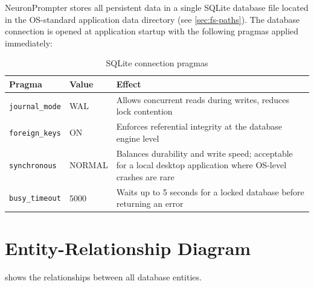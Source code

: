 \documentclass[a4paper, 11pt, oneside]{report}
\begin{document}
NeuronPrompter stores all persistent data in a single SQLite database file
located in the OS-standard application data directory (see
\cref{sec:fs-paths}).  The database connection is opened at application
startup with the following pragmas applied immediately:

\begin{table}[H]
  \centering
  \caption{SQLite connection pragmas}
  \label{tab:pragmas}
  \begin{tabularx}{\textwidth}{l l X}
    \toprule
    \textbf{Pragma} & \textbf{Value} & \textbf{Effect} \\
    \midrule
    \texttt{journal\_mode} & WAL    & Allows concurrent reads during writes,
                                       reduces lock contention~\cite{sqlite} \\
    \texttt{foreign\_keys}  & ON     & Enforces referential integrity at the
                                       database engine level \\
    \texttt{synchronous}    & NORMAL & Balances durability and write speed;
                                       acceptable for a local desktop application
                                       where OS-level crashes are rare \\
    \texttt{busy\_timeout}  & 5000   & Waits up to 5 seconds for a locked
                                       database before returning an error \\
    \bottomrule
  \end{tabularx}
\end{table}

\section{Entity-Relationship Diagram}
\label{sec:er-diagram}

 shows the relationships between all database entities.
\end{document}
